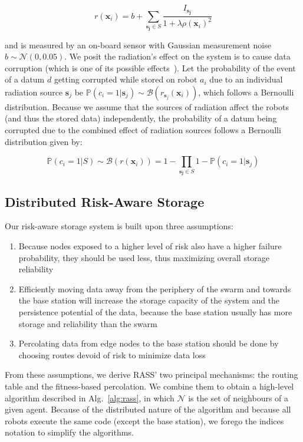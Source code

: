 \documentclass[letterpaper, 10 pt, conference]{ieeeconf}
\begin{document}
\begin{equation}
    r(\bm{x}_i) = b + \sum_{\bm{s_j} \in S} \frac{I_{\bm{s_j}}}{1 + \lambda\rho(\bm{x}_i)^2}
    \label{eq:radiation}
\end{equation}

and is measured by an on-board sensor with Gaussian measurement noise
$b \sim \mathcal{N}(0, 0.05)$. We posit the radiation's effect on the system is to cause 
data corruption (which is one of its possible effects~\cite{messenger1986effects}). Let the 
probability of the event of a datum $d$ getting corrupted while stored on robot $a_i$ due 
to an individual radiation  source $\bm{s}_j$ be
$\mathbb{P}(c_i = 1 | \bm{s}_j) \sim
\mathcal{B}(r_{\bm{s}_j}(\bm{x}_i))$, which follows a Bernoulli
distribution. Because we assume that the sources of radiation affect
the robots (and thus the stored data) independently, the probability of a datum being 
corrupted due to the combined effect of radiation sources follows a Bernoulli 
distribution given by:

\begin{equation}
    \mathbb{P}(c_i = 1 | S) \sim \mathcal{B}(r(\bm{x}_i)) = 1 - \prod_{\bm{s_j} \in S} 1 - \mathbb{P}(c_i = 1 | \bm{s}_j)
    \label{eq:failure}
\end{equation}


\subsection{Distributed Risk-Aware Storage}
Our risk-aware storage system is built upon three assumptions:

\begin{enumerate}
\item Because nodes exposed to a higher level of risk also have a higher
  failure probability, they should be used less, thus
  maximizing overall storage reliability
\item Efficiently moving data away from the periphery of the swarm and
  towards the base station will increase the storage capacity of the
  system and the persistence potential of the data, because the base
  station usually has more storage and reliability than the swarm
\item Percolating data from edge nodes to the base station should be
  done by choosing routes devoid of risk to minimize data loss
\end{enumerate}
From these assumptions, we derive RASS' two principal mechanisms: the routing table and the fitness-based percolation. We combine them to obtain a high-level algorithm described in Alg.~\ref{alg:rass}, in which $\mathcal{N}$ is the set of neighbours of a given agent. Because of the distributed nature of the algorithm and because all robots execute the same code (except the base station), we forego the indices notation to simplify the algorithms.
\end{document}
